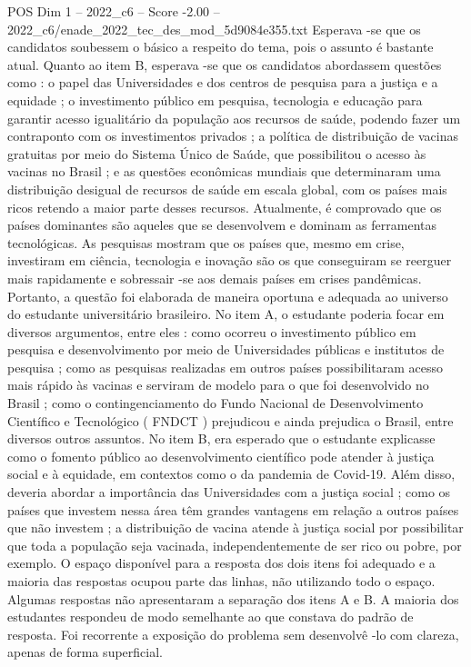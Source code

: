\begin{textsample}{POS Dim 1 – 2022\_c6 – Score -2.00 – 2022\_c6/enade\_2022\_tec\_des\_mod\_5d9084e355.txt}
Esperava -se que os candidatos soubessem o básico a respeito do tema, pois o assunto é bastante atual.
Quanto ao item B, esperava -se que os candidatos abordassem questões como : o papel das Universidades e dos centros de pesquisa para a justiça e a equidade ; o investimento público em pesquisa, tecnologia e educação para garantir acesso igualitário da população aos recursos de saúde, podendo fazer um contraponto com os investimentos privados ; a política de distribuição de vacinas gratuitas por meio do Sistema Único de Saúde, que possibilitou o acesso às vacinas no Brasil ; e as questões econômicas mundiais que determinaram uma distribuição desigual de recursos de saúde em escala global, com os países mais ricos retendo a maior parte desses recursos.
Atualmente, é comprovado que os países dominantes são aqueles que se desenvolvem e dominam as ferramentas tecnológicas.
As pesquisas mostram que os países que, mesmo em crise, investiram em ciência, tecnologia e inovação são os que conseguiram se reerguer mais rapidamente e sobressair -se aos demais países em crises pandêmicas.
Portanto, a questão foi elaborada de maneira oportuna e adequada ao universo do estudante universitário brasileiro.
No item A, o estudante poderia focar em diversos argumentos, entre eles : como ocorreu o investimento público em pesquisa e desenvolvimento por meio de Universidades públicas e institutos de pesquisa ; como as pesquisas realizadas em outros países possibilitaram acesso mais rápido às vacinas e serviram de modelo para o que foi desenvolvido no Brasil ; como o contingenciamento do Fundo Nacional de Desenvolvimento Científico e Tecnológico ( FNDCT ) prejudicou e ainda prejudica o Brasil, entre diversos outros assuntos.
No item B, era esperado que o estudante explicasse como o fomento público ao desenvolvimento científico pode atender à justiça social e à equidade, em contextos como o da pandemia de Covid-19.
Além disso, deveria abordar a importância das Universidades com a justiça social ; como os países que investem nessa área têm grandes vantagens em relação a outros países que não investem ; a distribuição de vacina atende à justiça social por possibilitar que toda a população seja vacinada, independentemente de ser rico ou pobre, por exemplo.
O espaço disponível para a resposta dos dois itens foi adequado e a maioria das respostas ocupou parte das linhas, não utilizando todo o espaço.
Algumas respostas não apresentaram a separação dos itens A e B.
A maioria dos estudantes respondeu de modo semelhante ao que constava do padrão de resposta.
Foi recorrente a exposição do problema sem desenvolvê -lo com clareza, apenas de forma superficial.

\end{textsample}
